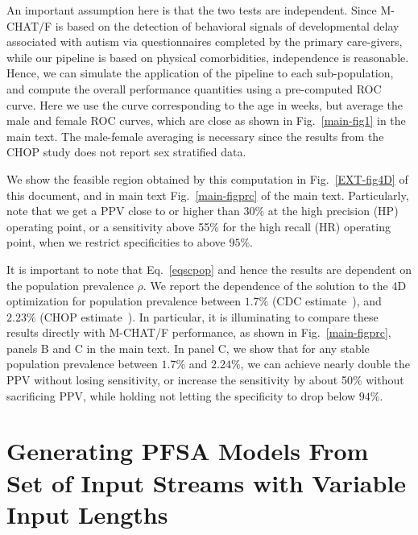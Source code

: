 \documentclass[3p,super,numbers,sort&compress,preprint,10pt]{elsarticle}
\begin{document}
An important assumption here is that the two tests are independent. Since M-CHAT/F is based on the detection of behavioral signals of developmental delay associated with autism via questionnaires completed by the primary care-givers, while our pipeline is based on  physical comorbidities, independence is reasonable. Hence, we can simulate the application of the pipeline to each sub-population, and compute the overall performance quantities using a pre-computed ROC curve. Here we use the curve corresponding to the age in weeks, but average the male and female ROC curves, which are  close as shown in Fig.~\ref{main-fig1} in the main text. The male-female averaging is necessary since the results from the CHOP study does not report sex stratified data.
 
We show the feasible region obtained by this computation in Fig.~\ref{EXT-fig4D} of this document, and in main text Fig.~\ref{main-figprc} of the main text. Particularly, note that we get a PPV close to or higher than $30\%$ at the high precision (HP) operating point, or a sensitivity above  55\% for the high recall (HR) operating point, when we restrict specificities to above $95\%$.
  
It is important to note  that Eq.~\eqref{eqscpop} and hence the results are dependent on the population prevalence $\rho$. We report the dependence of the solution to the 4D optimization for population prevalence between $1.7\%$ (CDC estimate~\cite{hyman2020identification}), and $2.23\%$ (CHOP estimate~\cite{pmid31562252}).
In particular, it is illuminating to compare these results directly with M-CHAT/F performance, as shown in Fig.~\ref{main-figprc}, panels B and C in the main text. In panel C, we show that for any stable population prevalence between 
$1.7\%$ and $2.24\%$, we can achieve nearly double the PPV without losing sensitivity, or increase the sensitivity by about 50\% without sacrificing PPV, while holding not letting the  specificity to drop below $94\%$.


\section{Generating PFSA Models From Set of Input Streams with Variable Input Lengths}\label{sec:varl}

  
\end{document}
